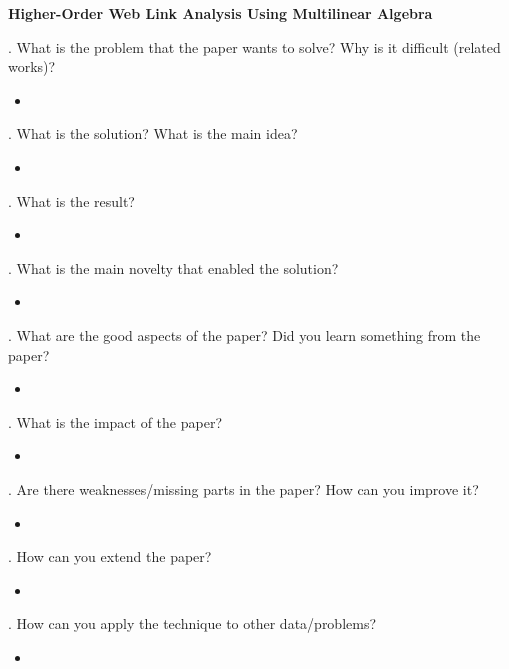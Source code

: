 \documentclass[12pt]{article}
\begin{document}
 

{\Large\centering
    \textbf{Higher-Order Web Link Analysis Using Multilinear Algebra}
\par}

\bigskip

. What is the problem that the paper wants to solve? Why is it difficult (related works)?

\begin{itemize}
    \item 
\end{itemize}

. What is the solution? What is the main idea?

\begin{itemize}
    \item 
\end{itemize}

. What is the result?

\begin{itemize}
    \item 
\end{itemize}

. What is the main novelty that enabled the solution?

\begin{itemize}
    \item 
\end{itemize}

. What are the good aspects of the paper? Did you learn something from the paper?

\begin{itemize}
    \item 
\end{itemize}

. What is the impact of the paper?

\begin{itemize}
    \item 
\end{itemize}

. Are there weaknesses/missing parts in the paper? How can you improve it?

\begin{itemize}
    \item 
\end{itemize}

. How can you extend the paper?

\begin{itemize}
    \item 
\end{itemize}

. How can you apply the technique to other data/problems?

\begin{itemize}
    \item 
\end{itemize}
\end{document}

